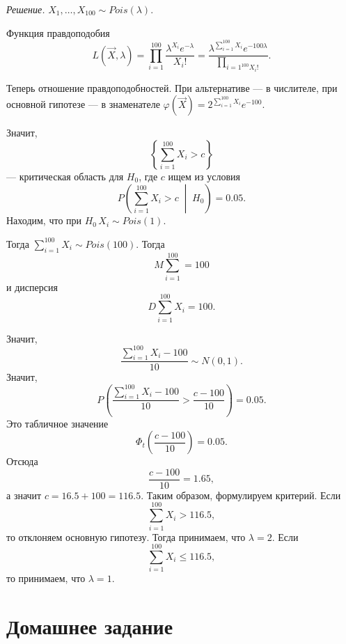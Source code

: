 \textit{Решение.} $X_1, \dotsc, X_{100} \sim Pois \left( \lambda \right) $.

Функция правдоподобия
$$L \left( \vec{X}, \lambda \right) =
  \prod \limits_{i = 1}^{100} \frac{ \lambda^{X_i} e^{- \lambda }}{X_i!} =
  \frac{ \lambda^{ \sum \limits_{i = 1}^{100} X_i} e^{-100 \lambda }}{ \prod \limits_{i = 1^{100} X_i!}}.$$

Теперь отношение правдоподобностей.
При альтернативе --- в числителе, при основной гипотезе ---
в знаменателе $ \varphi \left( \vec{X} \right) = 2^{ \sum \limits_{i = 1}^{100} X_i} e^{-100}$.

Значит,
$$ \left\{ \sum \limits_{i = 1}^{100} X_i > c \right\} $$
--- критическая область для $H_0$, где $c$ ищем из условия
$$P \left( \sum \limits_{i = 1}^{100} X_i > c \; \middle| \; H_0 \right) =
  0.05.$$
Находим, что при $H_0 \, X_i \sim Pois \left( 1 \right) $.

Тогда $ \sum \limits_{i = 1}^{100} X_i \sim Pois \left( 100 \right) $.
Тогда
$$M \sum \limits_{i = 1}^{100} =
  100$$
и дисперсия
$$D \sum \limits_{i = 1}^{100} X_i =
  100.$$

Значит,
$$ \frac{ \sum \limits_{i = 1}^{100} X_i - 100}{10} \sim
  N \left( 0, 1 \right).$$
Значит,
$$P \left( \frac{ \sum \limits_{i = 1}^{100} X_i - 100}{10} > \frac{c - 100}{10} \right) =
  0.05.$$
Это табличное значение
$$ \Phi_t \left( \frac{c - 100}{10} \right) =
  0.05.$$
Отсюда
$$ \frac{c - 100}{10} =
  1.65,$$
а значит $c = 16.5 + 100 = 116.5$.
Таким образом, формулируем критерий.
Если
$$ \sum \limits_{i = 1}^{100} X_i >
  116.5,$$
то отклоняем основную гипотезу.
Тогда принимаем, что $ \lambda = 2$.
Если
$$ \sum \limits_{i = 1}^{100} X_i \leq
  116.5,$$
то принимаем, что $ \lambda = 1$.

\section*{Домашнее задание}
